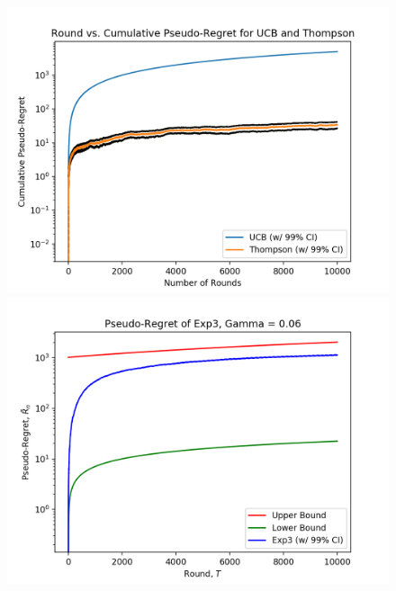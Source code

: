 \documentclass[12pt]{article}
\begin{document}
\begin{figure}[H]
\begin{minipage}[h]{0.5\linewidth}
\includegraphics[width=\linewidth, height=0.75\linewidth]{ucb_thompson_adversarial.png}
\end{minipage}
\begin{minipage}[h]{0.5\linewidth}
\includegraphics[width=\linewidth, height=0.75\linewidth]{exp3-1.png}
\end{minipage}
\begin{center}\begin{minipage}[h]{0.5\linewidth}

\end{minipage}
\end{center}
\end{figure}
\end{document}
